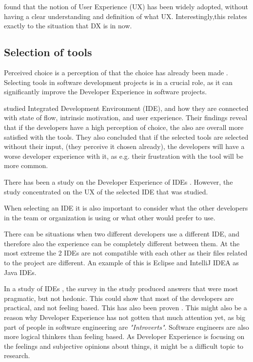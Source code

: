 \documentclass[english, 12pt, a4paper, sci, utf8, a-1b, online]{aaltothesis}
\begin{document}
\cite{understanding-ux} found that the notion of User Experience (UX) has been widely adopted, without having a clear understanding and definition of what UX. Interestingly,this relates exactly to the situation that DX is in now.

\subsection{Selection of tools}

Perceived choice is a perception of that the choice has already been made \citep{flow-intrinsic-dx}. Selecting tools in software development projects is in a crucial role, as it can significantly improve the Developer Experience in software projects.

\cite{flow-intrinsic-dx} studied Integrated Development Environment (IDE), and how they are connected with state of flow, intrinsic motivation, and user experience. Their findings reveal that if the developers have a high perception of choice, the also are overall more satisfied with the tools. They also concluded that if the selected tools are selected without their input, (they perceive it chosen already), the developers will have a worse developer experience with it, as e.g. their frustration with the tool will be more common.

There has been a study on the Developer Experience of IDEs \citep{software-developers-as-users}. However, the study concentrated on the UX of the selected IDE that was studied.

When selecting an IDE it is also important to consider what the other developers in the team or organization is using or what other would prefer to use.

\cite{design-framework-enchancing}

There can be situations when two different developers use a different IDE, and therefore also the experience can be completely different between them. At the most extreme the 2 IDEs are not compatible with each other as their files related to the project are different. An example of this is Eclipse and IntelliJ IDEA as Java IDEs.

In a study of IDEs \citep{software-developers-as-users}, the survey in the study produced answers that were most pragmatic, but not hedonic. This could show that most of the developers are practical, and not feeling based. This has also been proven \citep{personality-software}. This might also be a reason why Developer Experience has not gotten that much attention yet, as big part of people in software engineering are \textit{"Introverts"}. Software engineers are also more logical thinkers than feeling based. As Developer Experience is focusing on the feelings and subjective opinions about things, it might be a difficult topic to research.
\end{document}
